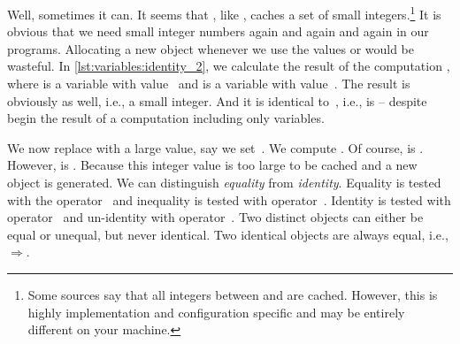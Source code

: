 Well, sometimes it can.
It seems that \python, like , caches a set of small integers.\footnote{%
Some sources say that all integers between  and  are cached. %
However, this is highly implementation and configuration specific and may be entirely different on your machine.%
}
It is obvious that we need small integer numbers again and again and again in our programs.
Allocating a new object whenever we use the values  or  would be wasteful.
In \cref{lst:variables:identity_2}, we calculate the result of the computation , where  is a variable with value~ and  is a variable with value~.
The result is obviously  as well, i.e., a small integer.
And it is identical to~, i.e.,  is  -- despite begin the result of a computation including only variables.

We now replace  with a large value, say we set~.
We compute .
Of course,  is .
However,  is .
Because this integer value is too large to be cached and a new object is generated.%
%
%
We can distinguish \emph{equality} from \emph{identity}.
Equality is tested with the operator~\pythonilIdx{==} and inequality is tested with operator~.
Identity is tested with operator~ and un-identity with operator~.
Two distinct objects can either be equal or unequal, but never identical.
Two identical objects are always equal, i.e., $\Rightarrow$.%
\endhsection%
\FloatBarrier%
\endhsection%
%
